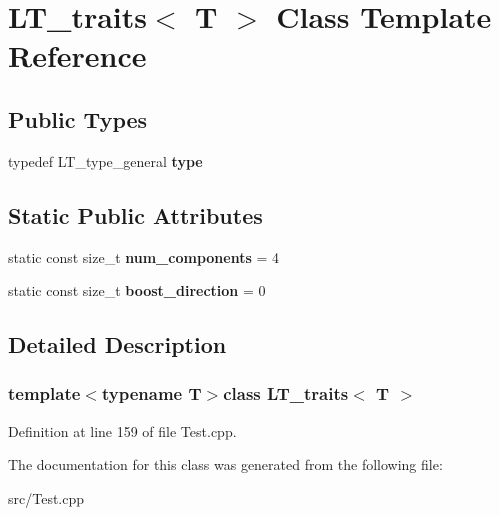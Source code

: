 \hypertarget{classLT__traits}{}\section{L\+T\+\_\+traits$<$ T $>$ Class Template Reference}
\label{classLT__traits}
\subsection*{Public Types}
\begin{DoxyCompactItemize}
\item 
\hypertarget{classLT__traits_ab52fb4d77646ced32bf74897b7127d7c}{}typedef L\+T\+\_\+type\+\_\+general {\bfseries type}\label{classLT__traits_ab52fb4d77646ced32bf74897b7127d7c}

\end{DoxyCompactItemize}
\subsection*{Static Public Attributes}
\begin{DoxyCompactItemize}
\item 
\hypertarget{classLT__traits_ab07a6434f97d50658ede5b7cce1125d7}{}static const size\+\_\+t {\bfseries num\+\_\+components} = 4\label{classLT__traits_ab07a6434f97d50658ede5b7cce1125d7}

\item 
\hypertarget{classLT__traits_adece528040ef3e09b82eb13c0a84f9ad}{}static const size\+\_\+t {\bfseries boost\+\_\+direction} = 0\label{classLT__traits_adece528040ef3e09b82eb13c0a84f9ad}

\end{DoxyCompactItemize}


\subsection{Detailed Description}
\subsubsection*{template$<$typename T$>$class L\+T\+\_\+traits$<$ T $>$}



Definition at line 159 of file Test.\+cpp.



The documentation for this class was generated from the following file\+:\begin{DoxyCompactItemize}
\item 
src/Test.\+cpp\end{DoxyCompactItemize}
